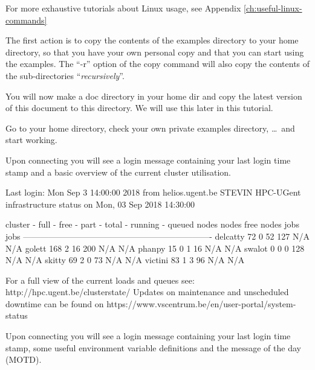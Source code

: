 \begin{tip}
For more exhaustive tutorials about Linux usage, see Appendix \ref{ch:useful-linux-commands}
\end{tip}

The first action is to copy the contents of the \hpc examples directory
to your home directory, so that you have your own personal copy and that
you can start using the examples. The ``-r'' option of the copy command
will also copy the contents of the sub-directories ``\emph{recursively}''.

\begin{prompt}
\end{prompt}

\ifgent
You will now make a doc directory in your home dir and copy the latest version of this document to this directory. We will use this later in this tutorial.

\begin{prompt}
\end{prompt}

Go to your home directory, check your own private examples directory, \dots\
and start working.

\begin{prompt}
\end{prompt}

Upon connecting you will see a login message containing your last login
time stamp and a basic overview of the current cluster utilisation.

\begin{prompt}
Last login: Mon Sep  3 14:00:00 2018 from helios.ugent.be
STEVIN HPC-UGent infrastructure status on Mon, 03 Sep 2018 14:30:00

   cluster - full - free -  part - total - running - queued
             nodes  nodes   free   nodes    jobs      jobs
-------------------------------------------------------------------
  delcatty     72      0     52     127      N/A       N/A
    golett    168      2     16     200      N/A       N/A
    phanpy     15      0      1      16      N/A       N/A
    swalot      0      0      0     128      N/A       N/A
    skitty     69      2      0      73      N/A       N/A
   victini     83      1      3      96      N/A       N/A

For a full view of the current loads and queues see:
 http://hpc.ugent.be/clusterstate/
Updates on maintenance and unscheduled downtime can be found on
 https://www.vscentrum.be/en/user-portal/system-status

\end{prompt}
\fi %
%
\ifbrussel
Upon connecting you will see a login message containing your last login
time stamp, some useful environment variable definitions and the message of the
day (MOTD).


